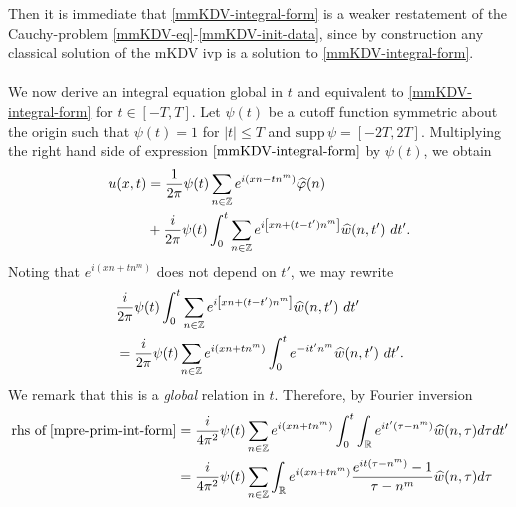 %
%
Then it is immediate that \eqref{mmKDV-integral-form} is a weaker 
restatement of the Cauchy-problem \eqref{mmKDV-eq}-\eqref{mmKDV-init-data}, 
since by construction any classical solution of the mKDV 
ivp is a solution to \eqref{mmKDV-integral-form}. 
\\
\\
%
%
We now derive an integral 
equation global in $t$ and equivalent to \eqref{mmKDV-integral-form} for $t 
\in [-T, T]$. Let $\psi(t)$ be a cutoff function symmetric about the 
origin such that $\psi(t) = 1$ for $|t| \le T$ and $\text{supp} \, \psi 
= [-2T, 2T ]$. Multiplying the right hand side of expression
$\eqref{mmKDV-integral-form}$ by $\psi(t)$, we obtain
%
%
\begin{equation}
	\begin{split}
		\label{mcutoff-int-eq}
		u(x, t)
		& = \frac{1}{2 \pi} \psi(t) \sum_{n \in \mathbb{Z}} e^{i(xn - t n^m)} \widehat{\varphi}(n) 
		\\
		& + \frac{i }{2 \pi} \psi(t) \int_0^t \sum_{n \in \mathbb{Z}} 
		e^{i\left[ xn + (t - t')n^m \right]} \widehat{w}(n, t') \ dt'.
	\end{split}
\end{equation}
%
%
Noting that $e^{i\left( xn + tn^m \right)}$ 
does not depend on $t'$, we may rewrite
%
%
\begin{equation}
	\label{mpre-prim-int-form}
	\begin{split}
		& \frac{i }{2 \pi} \psi(t) \int_0^t \sum_{n \in \mathbb{Z}} 
		e^{i\left[ xn + (t - t') n^m \right]} \widehat{w}(n, t') \ dt'
		\\
		& = \frac{i}{2 \pi} \psi(t) \sum_{n \in \mathbb{Z}} e^{i\left( xn + t 
		 n^m 
		\right)} \int_0^t e^{- it'n^m} \widehat{w}(n, t') \ dt'.
	\end{split}
\end{equation}
We remark that this is a \emph{global} relation in $t$. Therefore, by Fourier 
inversion
%
%
%
%
%
%
%
\begin{equation*}
	\begin{split}
		\text{rhs of} \; \eqref{mpre-prim-int-form}
		& = \frac{i}{4 \pi^2} \psi (t) \sum_{n \in \mathbb{Z}} e^{i\left( xn + t 
		 n^m
		\right)} \int_0^t \int_{\mathbb{R}} e^{it'\left( \tau - n^m \right) }
		\widehat{w}(n, \tau) d \tau dt'
		\\
		& = \frac{i}{4 \pi^2} \psi(t) \sum_{n \in \mathbb{Z}} \int_{\mathbb{R}} 
		e^{i\left( xn + tn^m \right)} \frac{e^{it\left( \tau - n^m 
		\right)}-1}{\tau - n^m} \widehat{w}(n, \tau) d \tau
	\end{split}
\end{equation*}

